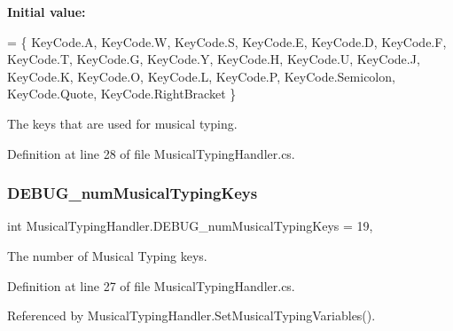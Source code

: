 {\bfseries Initial value\+:}
\begin{DoxyCode}
=
        \{
            KeyCode.A,
            KeyCode.W,
            KeyCode.S,
            KeyCode.E,
            KeyCode.D,
            KeyCode.F,
            KeyCode.T,
            KeyCode.G,
            KeyCode.Y,
            KeyCode.H,
            KeyCode.U,
            KeyCode.J,
            KeyCode.K,
            KeyCode.O,
            KeyCode.L,
            KeyCode.P,
            KeyCode.Semicolon,
            KeyCode.Quote,
            KeyCode.RightBracket
        \}
\end{DoxyCode}


The keys that are used for musical typing. 



Definition at line 28 of file Musical\+Typing\+Handler.\+cs.

\mbox{\label{group___mus_typ_const_ga1a5182f5dda1cd3a5b400911a3f4cb69}} 
\subsubsection{\texorpdfstring{D\+E\+B\+U\+G\+\_\+num\+Musical\+Typing\+Keys}{DEBUG\_numMusicalTypingKeys}}
{\footnotesize\ttfamily int Musical\+Typing\+Handler.\+D\+E\+B\+U\+G\+\_\+num\+Musical\+Typing\+Keys = 19\hspace{0.3cm}{\ttfamily [static]}, {\ttfamily [private]}}



The number of Musical Typing keys. 



Definition at line 27 of file Musical\+Typing\+Handler.\+cs.



Referenced by Musical\+Typing\+Handler.\+Set\+Musical\+Typing\+Variables().

